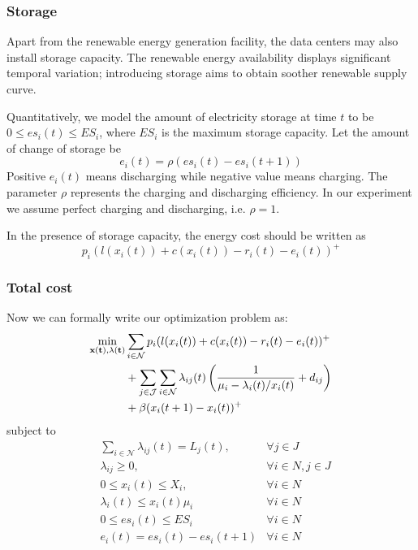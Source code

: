 \documentclass{acm_proc_article-sp}
\begin{document}
\subsubsection{Storage}
Apart from the renewable energy generation facility, the data centers may also install storage capacity. The renewable energy availability displays significant temporal variation; introducing storage aims to obtain soother renewable supply curve.

Quantitatively, we model the amount of electricity storage at time $t$ to be $0 \leq es_i(t) \leq ES_i$, where $ES_i$ is the maximum storage capacity. Let the amount of change of storage be 
$$e_i(t) = \rho (es_i(t) - es_i(t+1))$$
Positive $e_i(t)$ means discharging while negative value means charging. The parameter $\rho$ represents the charging and discharging efficiency. In our experiment we assume perfect charging and discharging, i.e. $\rho = 1$.

In the presence of storage capacity, the energy cost should be written as 
\begin{equation}
p_i(l(x_i(t)) + c(x_i(t)) - r_i(t) - e_i(t))^+
\end{equation} 

\subsubsection{Total cost}
Now we can formally write our optimization problem as:
\begin{align*}
\min_{\bf{x}(t), \bf{\lambda}(t)} & \sum_{i \in \mathcal{N}} p_i(l(x_i(t)) + c(x_i(t)) - r_i(t) - e_i(t))^+ \\
& + \sum_{j \in \mathcal{J}}\sum_{i \in \mathcal{N}}
\lambda_{ij}(t)\left(\frac{1}{\mu_i - \lambda_i(t)/x_i(t)} + d_{ij}\right) \\
& + \beta(x_i(t+1) - x_i(t))^+
\end{align*}
subject to
\begin{align*}
& \sum_{i\in \mathcal{N}}\lambda_{ij}(t) = L_j(t), &\forall j\in J  \\
& \lambda_{ij} \geq 0, & \forall i\in N, j\in J  \\
& 0 \leq x_i(t) \leq X_i, & \forall i \in N  \\
& \lambda_i(t) \leq x_i(t)\mu_i & \forall i \in N \\
& 0 \leq es_i(t) \leq ES_i & \forall i \in N \\
& e_i(t) = es_i(t) - es_i(t+1) & \forall i \in N
\end{align*}
\end{document}
